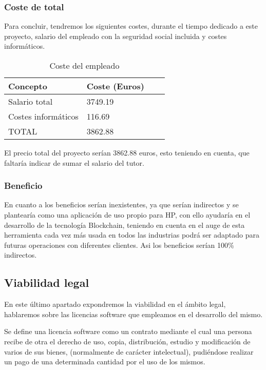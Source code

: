 \subsubsection{Coste de total}

Para concluir, tendremos los siguientes costes, durante el tiempo dedicado a este proyecto, salario del empleado con la seguridad social incluida y costes informáticos.

\begin{table}[H]
	\begin{center}
		\begin{tabular}{llll}
			Concepto              & Coste (Euros)\\ \hline
			Salario total         & 3749.19  \\ \hline	
			Costes informáticos	  & 116.69    \\ \hline
			TOTAL                 & 3862.88     \\
		\end{tabular}
	\caption{Coste del empleado}
	\label{tabla:tabla4}
	\end{center}
\end{table}

El precio total del proyecto serían 3862.88 euros, esto teniendo en cuenta, que faltaría indicar de sumar el salario del tutor.

\subsubsection{Beneficio}

En cuanto a los beneficios serían inexistentes, ya que serían indirectos y se plantearía como una aplicación de uso propio para HP, con ello ayudaría en el desarrollo de la tecnología Blockchain, teniendo en cuenta en el auge de esta herramienta cada vez más usada en todos las industrias podrá ser adaptado para futuras operaciones con diferentes clientes. Asi los beneficios serían 100\% indirectos. 


\subsection{Viabilidad legal}

En este último apartado expondremos la viabilidad en el ámbito legal, hablaremos sobre las licencias software que empleamos en el desarrollo del mismo.

Se define una licencia software \cite{licencia} como un contrato mediante el cual una persona recibe de otra el derecho de uso, copia, distribución, estudio y modificación de varios de sus bienes, (normalmente de carácter intelectual), pudiéndose realizar un pago de una determinada cantidad por el uso de los mismos.

